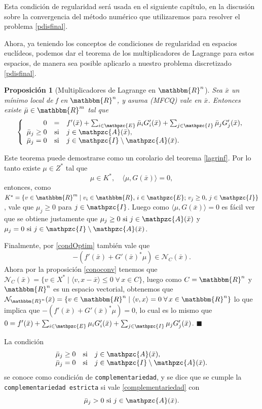 \documentclass[a4paper,10pt]{book}
\newcommand{\R}{\mathbbm{R}}
\newcommand{\Rn}{\R^n}
\newcommand{\bx}{\bar{x}}
\newcommand{\bmu}{\bar{\mu}}
\newcommand{\cN}{\mathcal{N}}
\newcommand{\cI}{\mathpzc{I}}
\newcommand{\cE}{\mathpzc{E}}
\newcommand{\cA}{\mathpzc{A}}
\newtheorem{prop}[teo]{Proposici\'on}
\newenvironment{dem}{\vspace*{-0.1cm}{\it Demostraci\'on:}}{\hfill
$\blacksquare$\\}
\begin{document}
Esta condición de regularidad será usada en el siguiente capítulo, en la discusión sobre la convergencia del método numérico que utilizaremos para resolver el problema \eqref{pdisfinal}.

Ahora, ya teniendo los conceptos de condiciones de regularidad en espacios euclídeos, podemos dar el teorema de los multiplicadores de Lagrange para estos espacios, de manera sea posible aplicarlo a nuestro problema discretizado \eqref{pdisfinal}.

\begin{prop}[Multiplicadores de Lagrange en $\Rn$]
 Sea $\bx$ un mínimo local de f en $\Rn$, y asuma (MFCQ) vale en $\bx$. Entonces existe $\bmu\in\R^m$ tal que
\begin{equation}\label{KKTfin}
    \left\{\begin{array}{rcl}
 0&=&f'(\bx)+\sum_{i\in\cE}\bmu_i G_i'(\bx) + \sum_{j\in\cI}\bmu_j G_j'(\bx),\\
 \bmu_j\geq0 &\mbox{si}& j\in \cA(\bx),\\
 \bmu_j =0 &\mbox{si}& j\in\cI\setminus\cA(\bx).
 \end{array}\right.
\end{equation}

\end{prop}

\begin{dem}
Este teorema puede demostrarse como un corolario del teorema \eqref{lagrinf}. Por lo tanto existe $\mu\in Z^*$ tal que $$\mu\in K^* ,\quad \langle\mu , G(\bx)\rangle = 0,$$
entonces, como $K^*=\{v\in\R^m\mid v_i\in\R,\, i\in\cE;\,v_j\geq0,\,j\in\cI\}$, vale que $\mu_j\geq0$ para $j\in\cI$. Luego como $\langle\mu , G(\bx)\rangle = 0$ es fácil ver que se obtiene justamente que $\mu_j\geq0 \mbox{ si } j\in \cA(\bx)$ y $\mu_j =0 \mbox{ si } j\in\cI\setminus \cA(\bx)$.

Finalmente, por \eqref{condOptim} también vale que $$ -(f'(\bx) + G'(\bx)^*\mu)\in \cN_C(\bx).$$
Ahora por la proposición \eqref{conoconv} tenemos que $\cN_{C}(\bx)=\{v\in X^*\mid\langle v,x-\bx\rangle\leq 0\; \forall\,x\in C\}$, luego como $C=\Rn$ y $\Rn$ es un espacio vectorial, obtenemos que $\cN_{\Rn}(\bx)=\{v\in {\Rn}\mid\langle v,x\rangle= 0\; \forall\,x\in \Rn\}$ lo que implica que $-(f'(\bx) + G'(\bx)^*\mu)=0$, lo cual es lo mismo que $0=f'(\bx)+\sum_{i\in\cE}\mu_i G_i'(\bx) + \sum_{j\in\cI}\mu_j G_j'(\bx)$.
\end{dem}

La condición 
\begin{equation}\label{complementariedad}
\begin{array}{rcl}
\bmu_j\geq0 &\mbox{si}& j\in \cA(\bx),\\
 \bmu_j =0 &\mbox{si}& j\in\cI\setminus\cA(\bx).
\end{array}
\end{equation}
se conoce como condición de \texttt{complementariedad}, y se dice que se cumple la \texttt{complementariedad estricta} si vale \eqref{complementariedad} con $$\bmu_j>0 \mbox{ si } j\in \cA(\bx).$$
\end{document}
